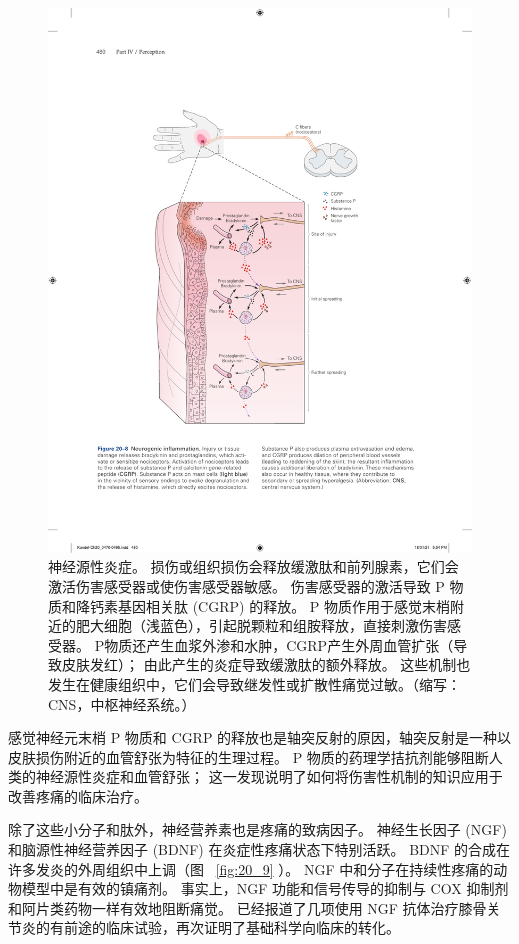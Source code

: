 \begin{figure}[htbp]
	\centering
	\includegraphics[width=0.7\linewidth]{chap20/fig_20_8}
	\caption{神经源性炎症。
		损伤或组织损伤会释放缓激肽和前列腺素，它们会激活伤害感受器或使伤害感受器敏感。
		伤害感受器的激活导致 P 物质和降钙素基因相关肽 (CGRP) 的释放。
		P 物质作用于感觉末梢附近的肥大细胞（浅蓝色），引起脱颗粒和组胺释放，直接刺激伤害感受器。
		P物质还产生血浆外渗和水肿，CGRP产生外周血管扩张（导致皮肤发红）； 由此产生的炎症导致缓激肽的额外释放。
		这些机制也发生在健康组织中，它们会导致继发性或扩散性痛觉过敏。（缩写：CNS，中枢神经系统。）}
	\label{fig:20_8}
\end{figure}


感觉神经元末梢 P 物质和 CGRP 的释放也是轴突反射的原因，轴突反射是一种以皮肤损伤附近的血管舒张为特征的生理过程。
P 物质的药理学拮抗剂能够阻断人类的神经源性炎症和血管舒张；
这一发现说明了如何将伤害性机制的知识应用于改善疼痛的临床治疗。


除了这些小分子和肽外，神经营养素也是疼痛的致病因子。
神经生长因子 (NGF) 和脑源性神经营养因子 (BDNF) 在炎症性疼痛状态下特别活跃。
BDNF 的合成在许多发炎的外周组织中上调（图 ~\ref{fig:20_9} ）。
NGF 中和分子在持续性疼痛的动物模型中是有效的镇痛剂。
事实上，NGF 功能和信号传导的抑制与 COX 抑制剂和阿片类药物一样有效地阻断痛觉。
已经报道了几项使用 NGF 抗体治疗膝骨关节炎的有前途的临床试验，再次证明了基础科学向临床的转化。


